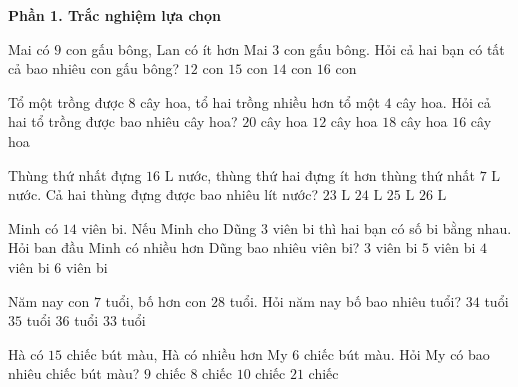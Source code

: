 \textbf{Phần 1. Trắc nghiệm lựa chọn}

\begin{ex} %
Mai có $9$ con gấu bông, Lan có ít hơn Mai $3$ con gấu bông. Hỏi cả hai bạn có tất cả bao nhiêu con gấu bông?
\choice
{$12$ con}
{\True $15$ con}
{$14$ con}
{$16$ con}
\end{ex}

\begin{ex} %
Tổ một trồng được $8$ cây hoa, tổ hai trồng nhiều hơn tổ một $4$ cây hoa. Hỏi cả hai tổ trồng được bao nhiêu cây hoa?
\choice
{\True $20$ cây hoa}
{$12$ cây hoa}
{$18$ cây hoa}
{$16$ cây hoa}
\end{ex}

\begin{ex} %
Thùng thứ nhất đựng $16\text{ L}$ nước, thùng thứ hai đựng ít hơn thùng thứ nhất $7\text{ L}$ nước. Cả hai thùng đựng được bao nhiêu lít nước?
\choice
{$23\text{ L}$}
{$24\text{ L}$}
{\True $25\text{ L}$}
{$26\text{ L}$}
\end{ex}

\begin{ex} %
Minh có $14$ viên bi. Nếu Minh cho Dũng $3$ viên bi thì hai bạn có số bi bằng nhau. Hỏi ban đầu Minh có nhiều hơn Dũng bao nhiêu viên bi?
\choice
{$3$ viên bi}
{$5$ viên bi}
{$4$ viên bi}
{\True $6$ viên bi}
\end{ex}

\begin{ex} %
Năm nay con $7$ tuổi, bố hơn con $28$ tuổi. Hỏi năm nay bố bao nhiêu tuổi?
\choice
{$34$ tuổi}
{\True $35$ tuổi}
{$36$ tuổi}
{$33$ tuổi}
\end{ex}

\begin{ex} %
Hà có $15$ chiếc bút màu, Hà có nhiều hơn My $6$ chiếc bút màu. Hỏi My có bao nhiêu chiếc bút màu?
\choice
{\True $9$ chiếc}
{$8$ chiếc}
{$10$ chiếc}
{$21$ chiếc}
\end{ex}


